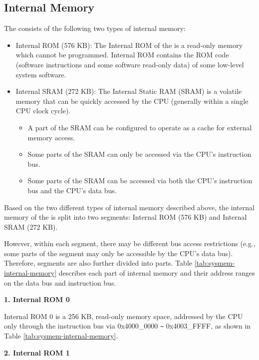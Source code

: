 \documentclass[main\_\_EN.tex]{subfiles}
\begin{document}
\subsection{Internal Memory}
\label{para:sysmem-internal-memory}

The \chipname{} consists of the following two types of internal memory:

\begin{itemize}
    \item Internal ROM (576 KB): The Internal ROM of the \chipname{} is a read-only memory which cannot be programmed. Internal ROM contains the ROM code (software instructions and some software read-only data) of some low-level system software.
    \item Internal SRAM (272 KB): The Internal Static RAM (SRAM) is a volatile memory that can be quickly accessed by the CPU (generally within a single CPU clock cycle).
    \begin{itemize}
        \item A part of the SRAM can be configured to operate as a cache for external memory access.
        \item Some parts of the SRAM can only be accessed via the CPU's instruction bus.
        \item Some parts of the SRAM can be accessed via both the CPU's instruction bus and the CPU's data bus.
    \end{itemize}
\end{itemize}

Based on the two different types of internal memory described above, the internal memory of the \chipname{} is split into two segments: Internal ROM (576 KB) and Internal SRAM (272 KB).


However, within each segment, there may be different bus access restrictions (e.g., some parts of the segment may only be accessible by the CPU's data bus). Therefore, segments are also further divided into parts. Table \ref{tab:sysmem-internal-memory} describes each part of internal memory and their address ranges on the data bus and instruction bus.




{\bfseries 1. Internal ROM 0}

Internal ROM 0 is a 256 KB, read-only memory space, addressed by the CPU only through the instruction bus via 0x4000\_0000 \verb+~+ 0x4003\_FFFF, as shown in Table \ref{tab:sysmem-internal-memory}.

{\bfseries 2. Internal ROM 1}
\label{other:sysmem-internal-rom1}
\end{document}

